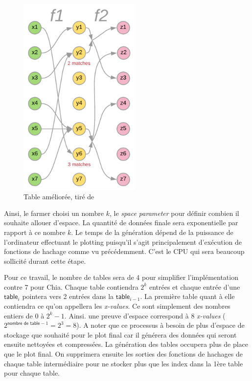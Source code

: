 \begin{figure}[H]
  \centering
  \includegraphics[width=6cm]{images/pospace_2.png}
  \caption{Table améliorée, tiré de \cite{chia:construction}}
\end{figure}

Ainsi, le farmer choisi un nombre $k$, le \emph{space parameter} pour définir combien il souhaite allouer d'espace. La quantité de données finale sera exponentielle par rapport à ce nombre $k$. Le temps de la génération dépend de la puissance de l'ordinateur effectuant le plotting puisqu'il s'agit principalement d'exécution de fonctions de hachage comme vu précédemment. C'est le CPU qui sera beaucoup sollicité durant cette étape. 

Pour ce travail, le nombre de tables sera de 4 pour simplifier l'implémentation contre 7 pour Chia. Chaque table contiendra $2^k$ entrées et chaque entrée d'une $\textsf{table}_i$ pointera vers 2 entrées dans la $\textsf{table}_{i-1}$. La première table quant à elle contiendra ce qu'on appellera les \emph{x-values}. Ce sont simplement des nombres entiers de $0$ à $2^k-1$. Ainsi. une preuve d'espace correspond à 8 \emph{x-values} ($2^{\textsf{nombre de table} - 1} = 2^3 = 8$). A noter que ce processus à besoin de plus d'espace de stockage que souhaité pour le plot final car il générera des données qui seront ensuite nettoyées et compressées. La génération des tables occupera plus de place que le plot final. On supprimera ensuite les sorties des fonctions de hachages de chaque table intermédiaire pour ne stocker plus que les index dans la 1ère table pour chaque table.


